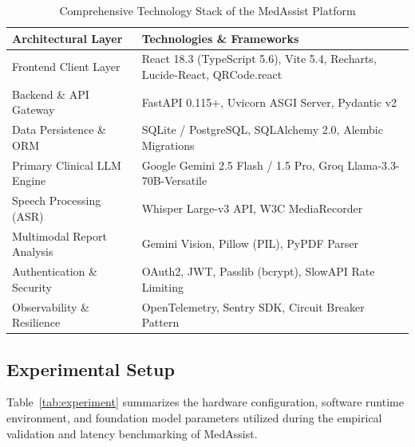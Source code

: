 \documentclass[conference]{IEEEtran}
\begin{document}
\begin{table}[t]
\centering
\caption{Comprehensive Technology Stack of the MedAssist Platform}
\label{tab:techstack}
\renewcommand{\arraystretch}{1.15}
\footnotesize
\begin{tabularx}{\textwidth}{|>{\raggedright\arraybackslash}p{}|L|}
\hline
\textbf{Architectural Layer} & \textbf{Technologies \& Frameworks} \\
\hline
Frontend Client Layer &
React 18.3 (TypeScript 5.6), Vite 5.4, Recharts, Lucide-React, QRCode.react \\
\hline
Backend \& API Gateway &
FastAPI 0.115+, Uvicorn ASGI Server, Pydantic v2 \\
\hline
Data Persistence \& ORM &
SQLite / PostgreSQL, SQLAlchemy 2.0, Alembic Migrations \\
\hline
Primary Clinical LLM Engine &
Google Gemini 2.5 Flash / 1.5 Pro, Groq Llama-3.3-70B-Versatile \\
\hline
Speech Processing (ASR) &
Whisper Large-v3 API, W3C MediaRecorder \\
\hline
Multimodal Report Analysis &
Gemini Vision, Pillow (PIL), PyPDF Parser \\
\hline
Authentication \& Security &
OAuth2, JWT, Passlib (bcrypt), SlowAPI Rate Limiting \\
\hline
Observability \& Resilience &
OpenTelemetry, Sentry SDK, Circuit Breaker Pattern \\
\hline
\end{tabularx}
\end{table}

\subsection{Experimental Setup}

Table~\ref{tab:experiment} summarizes the hardware configuration, software runtime environment, and foundation model parameters utilized during the empirical validation and latency benchmarking of MedAssist.
\end{document}
